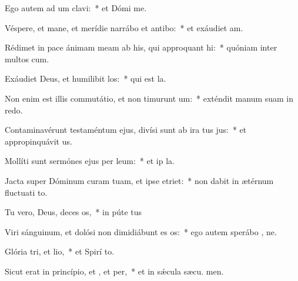 \item Ego autem ad um clavi:~* et Dómi  me.
\item Véspere, et mane, et merídie narrábo et antibo:~* et exáudiet  am.
\item Rédimet in pace ánimam meam ab his, qui approquant hi:~* quóniam inter multos  cum.
\item Exáudiet Deus, et humilibit los:~* qui est  la.
\item Non enim est illis commutátio, et non timurunt um:~* exténdit manum suam in redo.
\item Contaminavérunt testaméntum ejus, divísi sunt ab ira tus jus:~* et appropinquávit  us.
\item Mollíti sunt sermónes ejus per leum:~* et ip  la.
\item Jacta super Dóminum curam tuam, et ipse  etriet:~* non dabit in ætérnum fluctuati to.
\item Tu vero, Deus, deces os,~* in púte tus
\item Viri sánguinum, et dolósi non dimidiábunt es os:~* ego autem sperábo  , ne.
\item Glória tri, et lio,~* et Spirí to.
\item Sicut erat in princípio, et , et per,~* et in sǽcula sæcu. men.
